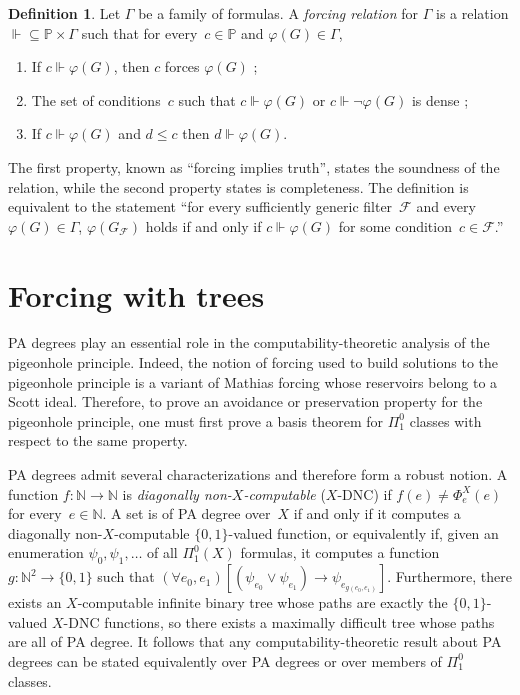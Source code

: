 \documentclass{article}
\def\NN{\mathbb{N}}
\def\PP{\mathbb{P}}
\def\F{\mathcal{F}}
\def\PP{\mathbb{P}}
\def\qt#1{``#1''}%
\numberwithin{theorem}{section}
\theoremstyle{definition}
\newtheorem{definition}[theorem]{Definition}
\begin{document}
\begin{definition}\label{def:forcing-relation}
Let $\Gamma$ be a family of formulas. A \emph{forcing relation} for $\Gamma$ is a relation $\Vdash \subseteq \PP \times \Gamma$ such that for every~$c \in \PP$ and $\varphi(G) \in \Gamma$,
\begin{enumerate}
    \item If $c \Vdash \varphi(G)$, then $c$ forces $\varphi(G)$ ;
    \item The set of conditions~$c$ such that $c \Vdash \varphi(G)$ or $c \Vdash \neg \varphi(G)$ is dense ;
    \item If $c \Vdash \varphi(G)$ and $d \leq c$ then $d \Vdash \varphi(G)$.
\end{enumerate}
\end{definition}

The first property, known as \qt{forcing implies truth}, states the soundness of the relation, while the second property states is completeness. The definition is equivalent to the statement \qt{for every sufficiently generic filter~$\F$ and every~$\varphi(G) \in \Gamma$, $\varphi(G_\F)$ holds if and only if $c \Vdash \varphi(G)$ for some condition~$c \in \F$.}


\section{Forcing with trees}\label{sect:forcing-trees}

PA degrees play an essential role in the computability-theoretic analysis of the pigeonhole principle. Indeed, the notion of forcing used to build solutions to the pigeonhole principle is a variant of Mathias forcing whose reservoirs belong to a Scott ideal. Therefore, to prove an avoidance or preservation property for the pigeonhole principle, one must first prove a basis theorem for $\Pi^0_1$ classes with respect to the same property.

PA degrees admit several characterizations and therefore form a robust notion. A function $f : \NN \to \NN$ is \emph{diagonally non-$X$-computable} ($X$-DNC) if $f(e) \neq \Phi_e^X(e)$ for every~$e \in \NN$. A set is of PA degree over~$X$ if and only if it computes a diagonally non-$X$-computable $\{0,1\}$-valued function, or equivalently if, given an enumeration $\psi_0, \psi_1, \dots$ of all $\Pi^0_1(X)$ formulas, it computes a function $g : \NN^2 \to \{0,1\}$ such that $(\forall e_0, e_1)[(\psi_{e_0} \vee \psi_{e_1}) \rightarrow \psi_{e_{g(e_0, e_1)}}]$. Furthermore, there exists an $X$-computable infinite binary tree whose paths are exactly the $\{0,1\}$-valued $X$-DNC functions, so there exists a maximally difficult tree whose paths are all of PA degree. It follows that any computability-theoretic result about PA degrees can be stated equivalently over PA degrees or over members of $\Pi^0_1$ classes.
\end{document}
